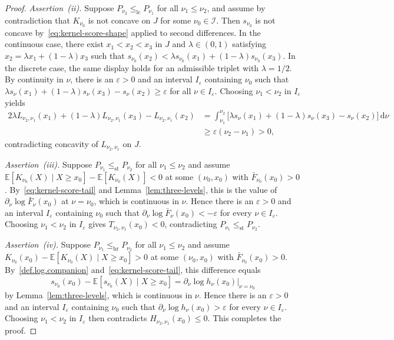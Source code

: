 \documentclass[10pt,a4paper]{amsart}
\newcommand{\E}{\mathbb{E}}
\newcommand{\dx}[1][x]{%
	\ensuremath{
		{\mathrm{d}}{#1}
	}
}
\newcommand{\hr}{\le_{\mathrm{hr}}}
\providecommand{\lc}{\le_{\mathrm{lc}}}
\newcommand{\st}{\le_{\mathrm{st}}}
\begin{document}
\begin{proof}
\emph{Assertion~\textup{(ii)}.} Suppose \(P_{\nu_2}\lc P_{\nu_1}\) for all \(\nu_1\le\nu_2\), and assume by contradiction that \(K_{\nu_0}\) is not concave on \(J\) for some \(\nu_0 \in \mathcal I\). Then $s_{\nu_0}$ is not concave by~\eqref{eq:kernel-score-shape} applied to second differences. In the continuous case, there exist \(x_1<x_2<x_3\) in \(J\) and \(\lambda\in(0,1)\) satisfying \(x_2=\lambda x_1+(1-\lambda)x_3\) such that
\(s_{\nu_0}(x_2) <\lambda s_{\nu_0}(x_1)+(1-\lambda)s_{\nu_0}(x_3).\)
In the discrete case, the same display holds for an admissible triplet with \(\lambda=1/2\).
By continuity in \(\nu\), there is an \(\varepsilon>0\) and an interval $I_\varepsilon$ containing $\nu_0$ such that \(\lambda s_\nu(x_1)+(1-\lambda)s_\nu(x_3)-s_\nu(x_2)\ge\varepsilon\) for all \(\nu\in I_\varepsilon\). Choosing \(\nu_1<\nu_2\) in \(I_\varepsilon\) yields
\begin{alignat*}{2}
\lambda L_{\nu_2,\nu_1}(x_1) +(1-\lambda)L_{\nu_2,\nu_1}(x_3) -L_{\nu_2,\nu_1}(x_2)
&=\int_{\nu_1}^{\nu_2} \bigl[\lambda s_\nu(x_1)+(1-\lambda)s_\nu(x_3)-s_\nu(x_2)\bigr]\,\dx[\nu]\\
&\ge \varepsilon(\nu_2-\nu_1)>0,
\end{alignat*}
contradicting concavity of \(L_{\nu_2,\nu_1}\) on \(J\).

\emph{Assertion~\textup{(iii)}.} Suppose \(P_{\nu_1}\st P_{\nu_2}\) for all \(\nu_1\le\nu_2\) and assume \(\E[K_{\nu_0}(X)\mid X\ge x_0]-\E[K_{\nu_0}(X)]<0\) at some \((\nu_0,x_0)\) with \(\bar F_{\nu_0}(x_0)>0\). By~\eqref{eq:kernel-score-tail} and Lemma~\ref{lem:three-levels}, this is the value of $\partial_\nu\log\bar F_\nu(x_0)$ at $\nu=\nu_0$, which is continuous in $\nu$. Hence there is an \(\varepsilon>0\) and an interval \(I_\varepsilon\) containing \(\nu_0\) such that $\partial_\nu\log\bar F_\nu(x_0)<-\varepsilon$ for every $\nu\in I_\varepsilon$. Choosing \(\nu_1<\nu_2\) in \(I_\varepsilon\) gives $T_{\nu_2,\nu_1}(x_0)<0$, contradicting \(P_{\nu_1}\st P_{\nu_2}\).

\emph{Assertion~\textup{(iv)}.} Suppose \(P_{\nu_1}\hr P_{\nu_2}\) for all \(\nu_1\le\nu_2\) and assume \(K_{\nu_0}(x_0)-\E[K_{\nu_0}(X)\mid X\ge x_0]>0\) at some \((\nu_0,x_0)\) with \(\bar F_{\nu_0}(x_0)>0\). By~\eqref{def.log.companion} and~\eqref{eq:kernel-score-tail}, this difference equals
\[
s_{\nu_0}(x_0)-\E[s_{\nu_0}(X)\mid X\ge x_0]=\partial_\nu\log h_\nu(x_0)\Big|_{\nu=\nu_0}
\]
by Lemma~\ref{lem:three-levels}, which is continuous in $\nu$. Hence there is an \(\varepsilon>0\) and an interval \(I_\varepsilon\) containing \(\nu_0\) such that $\partial_\nu\log h_\nu(x_0)>\varepsilon$ for every $\nu\in I_\varepsilon$. Choosing \(\nu_1<\nu_2\) in \(I_\varepsilon\) then contradicts $H_{\nu_2,\nu_1}(x_0)\le 0$. This completes the proof.
\end{proof}
\end{document}
